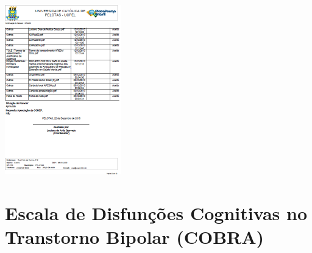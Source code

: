 \documentclass[chapter=TITLE,
               oneside,
               12pt,
               a4paper,
               english,
               brazil]{abntex2}    %
\begin{document}
\begin{anexosenv}
        \begin{center}
        \includegraphics[width=.95\textwidth]{img/cartacep03.pdf}
        \end{center}

    \chapter{Escala de Disfunções Cognitivas no Transtorno Bipolar (COBRA)}


\end{anexosenv}
\end{document}
